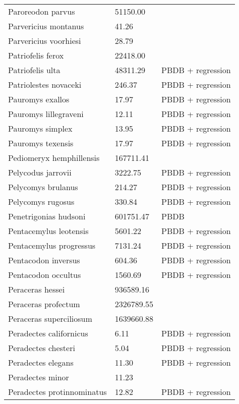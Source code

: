 \documentclass{article}
\begin{document}
\begin{center}
\begin{longtable}{p{} p{} p{}}
    Paroreodon parvus & 51150.00 & \cite{McKenna2011} \\ 
    Parvericius montanus & 41.26 & \cite{Tomiya2013} \\ 
    Parvericius voorhiesi & 28.79 & \cite{Tomiya2013} \\ 
    Patriofelis ferox & 22418.00 & \cite{McKenna2011} \\ 
    Patriofelis ulta & 48311.29 & PBDB + regression \\ 
    Patriolestes novaceki & 246.37 & PBDB + regression \\ 
    Pauromys exallos & 17.97 & PBDB + regression \\ 
    Pauromys lillegraveni & 12.11 & PBDB + regression \\ 
    Pauromys simplex & 13.95 & PBDB + regression \\ 
    Pauromys texensis & 17.97 & PBDB + regression \\ 
    Pediomeryx hemphillensis & 167711.41 & \cite{Tomiya2013} \\ 
    Pelycodus jarrovii & 3222.75 & PBDB + regression \\ 
    Pelycomys brulanus & 214.27 & PBDB + regression \\ 
    Pelycomys rugosus & 330.84 & PBDB + regression \\ 
    Penetrigonias hudsoni & 601751.47 & PBDB \\ 
    Pentacemylus leotensis & 5601.22 & PBDB + regression \\ 
    Pentacemylus progressus & 7131.24 & PBDB + regression \\ 
    Pentacodon inversus & 604.36 & PBDB + regression \\ 
    Pentacodon occultus & 1560.69 & PBDB + regression \\ 
    Peraceras hessei & 936589.16 & \cite{Tomiya2013} \\ 
    Peraceras profectum & 2326789.55 & \cite{Tomiya2013} \\ 
    Peraceras superciliosum & 1639660.88 & \cite{Tomiya2013} \\ 
    Peradectes californicus & 6.11 & PBDB + regression \\ 
    Peradectes chesteri & 5.04 & PBDB + regression \\ 
    Peradectes elegans & 11.30 & PBDB + regression \\ 
    Peradectes minor & 11.23 & \cite{Taylor1976} \\ 
    Peradectes protinnominatus & 12.82 & PBDB + regression \\ 

\end{longtable}
\end{center}
\end{document}
